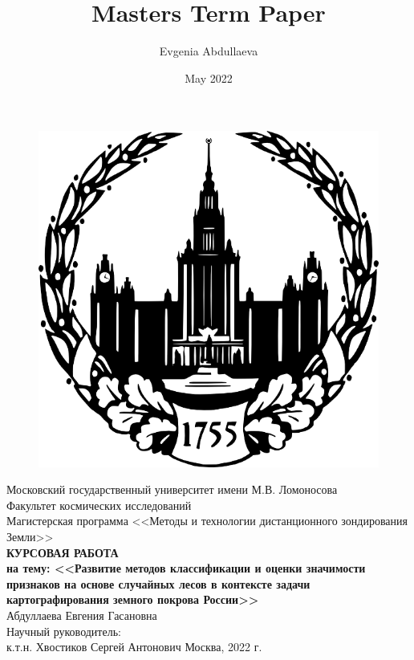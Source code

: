\documentclass[14pt, a4paper, oneside]{extarticle}
\title{Masters Term Paper}
\author{Evgenia Abdullaeva}
\date{May 2022}
\begin{document}
\begin{titlepage}
    \centering
        \begin{figure}[H]
            \centering
            \includegraphics[scale=1.6]{msu-logo}
        \end{figure}
        Московский государственный университет имени М.В. Ломоносова\\
        \vspace{0.5cm}
        Факультет космических исследований\\
        Магистерская программа <<Методы и технологии дистанционного зондирования Земли>>\\
        \vfill
        \textbf{КУРСОВАЯ РАБОТА\\
        на тему: <<Развитие методов классификации и оценки значимости признаков на основе случайных лесов в контексте задачи картографирования земного покрова России>>}\\
        \vfill
        Абдуллаева Евгения Гасановна\\
        \vspace{0.5cm}
        Научный руководитель:\\
        к.т.н. Хвостиков Сергей Антонович
        \vfill
        Москва, 2022 г.
\end{titlepage}
\end{document}
